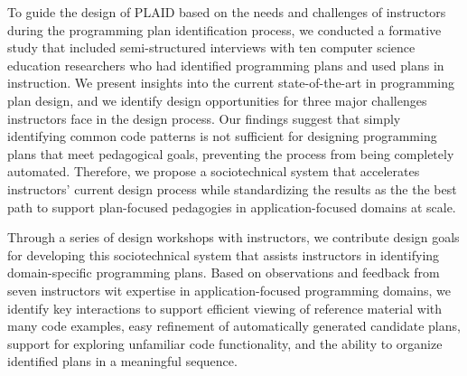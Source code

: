 To guide the design of PLAID based on the needs and challenges of instructors during the programming plan identification process, we conducted a formative study that included semi-structured interviews with ten computer science education researchers who had identified programming plans and used plans in instruction. We present insights into the current state-of-the-art in programming plan design, and we identify design opportunities for three major challenges instructors face in the design process.
Our findings suggest that simply identifying common code patterns is not sufficient for designing programming plans that meet pedagogical goals, preventing the process from being completely automated. 
Therefore, we propose a sociotechnical system that accelerates instructors' current design process
while standardizing the results
as the 
the best path to support plan-focused pedagogies in application-focused domains at scale. %



Through a series of design workshops with instructors, we contribute design goals for developing this sociotechnical system that assists instructors in identifying domain-specific programming plans.
Based on observations and feedback from seven instructors wit expertise in application-focused programming domains, 
we identify key interactions to support efficient viewing of reference material with many code examples, easy refinement of automatically generated candidate plans, support for exploring unfamiliar code functionality, and the ability to organize identified plans in a meaningful sequence.

